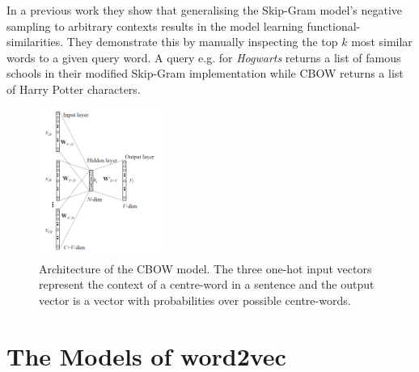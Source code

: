 \documentclass[conference]{IEEEtran}
\begin{document}
In a previous work \cite{levy2014dependency} they show that generalising the Skip-Gram 
model's negative sampling to arbitrary contexts results in the model learning 
functional-similarities. They demonstrate this by manually inspecting the top $k$ most 
similar words to a given query word. A query e.g. for \textit{Hogwarts} returns
a list of famous schools in their modified Skip-Gram implementation while CBOW returns 
a list of Harry Potter characters.

\begin{figure}[t]
\centering
\includegraphics[width=0.375\textwidth]{cbow}
\caption{Architecture of the CBOW model. The three one-hot input vectors represent the context 
of a centre-word in a sentence and the output vector is a vector with probabilities over possible 
centre-words. }
\label{fig:cbow}
\end{figure}

\section{The Models of word2vec}
\label{sec:model}
\end{document}

